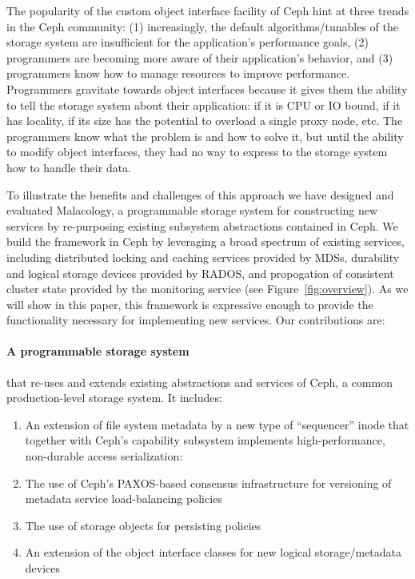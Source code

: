 \documentclass[10pt,twocolumn]{article}
\begin{document}
The popularity of the custom object interface facility of Ceph hint at three
trends in the Ceph community: (1) increasingly, the default
algorithms/tunables of the storage system are insufficient for the
application's performance goals, (2) programmers are becoming more aware
of their application's behavior, and (3) programmers know how to manage
resources to improve performance. Programmers gravitate towards object
interfaces because it gives them the ability to tell the storage system
about their application: if it is CPU or IO bound, if it has locality,
if its size has the potential to overload a single proxy node, etc. The
programmers know what the problem is and how to solve it, but until
the ability to modify object interfaces, they had no way to express to the storage system how to handle
their data.

To illustrate the benefits and challenges of this approach we have
designed and evaluated Malacology, a programmable storage system for
constructing new services by re-purposing existing subsystem
abstractions contained in Ceph. We build the framework in Ceph by
leveraging a broad spectrum of existing services, including distributed
locking and caching services provided by MDSs, durability and logical
storage devices provided by RADOS, and propogation of consistent cluster
state provided by the monitoring service (see Figure~\ref{fig:overview}). As we will show in this paper, this framework is expressive enough to provide the
functionality necessary for implementing new services. Our contributions
are:

\paragraph*{A programmable storage system} that re-uses and extends existing abstractions and services of Ceph, a common production-level storage system. It includes:

  \begin{enumerate}
  \item
    An extension of file system metadata by a new type of ``sequencer'' inode that together with Ceph's capability subsystem implements high-performance, non-durable access serialization:
  \item
    The use of Ceph's PAXOS-based consensus infrastructure for versioning of metadata service load-balancing policies
  \item
    The use of storage objects for persisting policies
  \item
    An extension of the object interface classes for new logical storage/metadata devices
  \end{enumerate}
\end{document}
